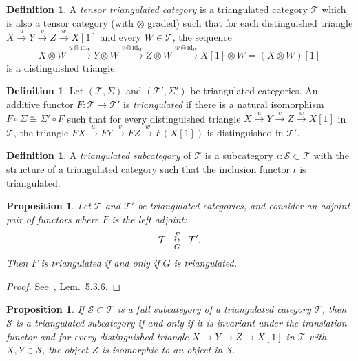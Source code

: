 \documentclass[12pt,a4paper]{article}
\providecommand{\rightleftarrows}{%
  \mathrel{\rightarrow\mkern-14mu\leftarrow}}
\newtheorem{proposition}[theorem]{Proposition}
\theoremstyle{definition}
\newtheorem{definition}[theorem]{Definition}
\newcommand{\id}{\mathrm{id}}
\begin{document}
\begin{definition}\label{def:tensor-triangulated}
A \emph{tensor triangulated category} is a triangulated category
$\mathcal{T}$ which is also a tensor category (with $\otimes$ graded) such that for
each distinguished triangle
$X\xrightarrow{u} Y\xrightarrow{v} Z\xrightarrow{w} X[1]$
and every $W\in\mathcal{T}$, the sequence
\[
  X\otimes W\xrightarrow{u\otimes\id_W} Y\otimes W
  \xrightarrow{v\otimes\id_W} Z\otimes W
  \xrightarrow{w\otimes\id_W} X[1]\otimes W = (X\otimes W)[1]
\]
is a distinguished triangle.
\end{definition}

\begin{definition}\label{def:triangulated-functor}
Let $(\mathcal{T},\Sigma)$ and $(\mathcal{T}',\Sigma')$ be triangulated categories.
An additive functor $F:\mathcal{T}\to\mathcal{T}'$ is \emph{triangulated} if there
is a natural isomorphism $F\circ\Sigma\cong\Sigma'\circ F$ such that for every
distinguished triangle $X\xrightarrow{u}Y\xrightarrow{v}Z\xrightarrow{w}X[1]$
in $\mathcal{T}$, the triangle
$FX\xrightarrow{u}FY\xrightarrow{v}FZ\xrightarrow{w}F(X[1])$ is distinguished in
$\mathcal{T}'$.
\end{definition}

\begin{definition}\label{def:triangulated-subcategory}
A \emph{triangulated subcategory} of $\mathcal{T}$ is a subcategory
$\iota:\mathcal{S}\subset\mathcal{T}$ with the structure of a triangulated category
such that the inclusion functor $\iota$ is triangulated.
\end{definition}

\begin{proposition}\label{prop:adjoint-triangulated}
Let $\mathcal{T}$ and $\mathcal{T}'$ be triangulated categories, and consider an
adjoint pair of functors where $F$ is the left adjoint:
\[
\mathcal{T}\;\overset{F}{\underset{G}{\rightleftarrows}}\;\mathcal{T}'.
\]
Then $F$ is triangulated if and only if $G$ is triangulated.
\end{proposition}
\begin{proof}
See~\cite{Nee01}, Lem.\ 5.3.6.
\end{proof}

\begin{proposition}\label{prop:full-subcategory}
If $\mathcal{S}\subset\mathcal{T}$ is a full subcategory of a triangulated category
$\mathcal{T}$, then $\mathcal{S}$ is a triangulated subcategory if and only if it is
invariant under the translation functor and for every distinguished triangle
$X\to Y\to Z\to X[1]$ in $\mathcal{T}$ with $X,Y\in\mathcal{S}$, the object $Z$ is
isomorphic to an object in $\mathcal{S}$.
\end{proposition}
\end{document}
